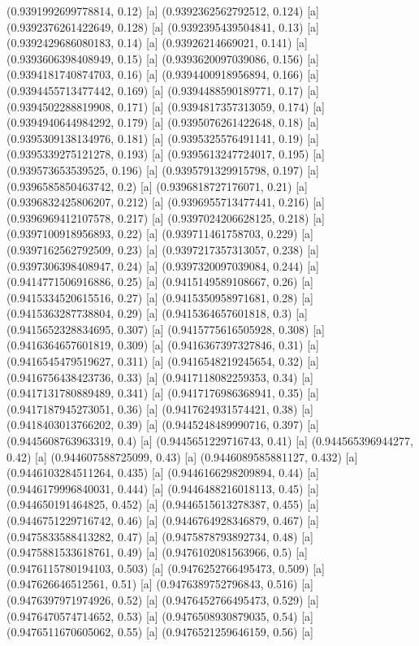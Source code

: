 {{{(0.9391992699778814, 0.12) [a] 
(0.9392362562792512, 0.124) [a] 
(0.9392376261422649, 0.128) [a] 
(0.9392395439504841, 0.13) [a] 
(0.9392429686080183, 0.14) [a] 
(0.93926214669021, 0.141) [a] 
(0.9393606398408949, 0.15) [a] 
(0.9393620097039086, 0.156) [a] 
(0.9394181740874703, 0.16) [a] 
(0.9394400918956894, 0.166) [a] 
(0.9394455713477442, 0.169) [a] 
(0.9394488590189771, 0.17) [a] 
(0.9394502288819908, 0.171) [a] 
(0.9394817357313059, 0.174) [a] 
(0.9394940644984292, 0.179) [a] 
(0.9395076261422648, 0.18) [a] 
(0.9395309138134976, 0.181) [a] 
(0.9395325576491141, 0.19) [a] 
(0.9395339275121278, 0.193) [a] 
(0.9395613247724017, 0.195) [a] 
(0.939573653539525, 0.196) [a] 
(0.9395791329915798, 0.197) [a] 
(0.9396585850463742, 0.2) [a] 
(0.9396818727176071, 0.21) [a] 
(0.9396832425806207, 0.212) [a] 
(0.9396955713477441, 0.216) [a] 
(0.9396969412107578, 0.217) [a] 
(0.9397024206628125, 0.218) [a] 
(0.9397100918956893, 0.22) [a] 
(0.939711461758703, 0.229) [a] 
(0.9397162562792509, 0.23) [a] 
(0.9397217357313057, 0.238) [a] 
(0.9397306398408947, 0.24) [a] 
(0.9397320097039084, 0.244) [a] 
(0.9414771506916886, 0.25) [a] 
(0.9415149589108667, 0.26) [a] 
(0.9415334520615516, 0.27) [a] 
(0.9415350958971681, 0.28) [a] 
(0.9415363287738804, 0.29) [a] 
(0.9415364657601818, 0.3) [a] 
(0.9415652328834695, 0.307) [a] 
(0.9415775616505928, 0.308) [a] 
(0.9416364657601819, 0.309) [a] 
(0.9416367397327846, 0.31) [a] 
(0.9416545479519627, 0.311) [a] 
(0.9416548219245654, 0.32) [a] 
(0.9416756438423736, 0.33) [a] 
(0.9417118082259353, 0.34) [a] 
(0.9417131780889489, 0.341) [a] 
(0.9417176986368941, 0.35) [a] 
(0.9417187945273051, 0.36) [a] 
(0.9417624931574421, 0.38) [a] 
(0.9418403013766202, 0.39) [a] 
(0.9445248489990716, 0.397) [a] 
(0.9445608763963319, 0.4) [a] 
(0.9445651229716743, 0.41) [a] 
(0.944565396944277, 0.42) [a] 
(0.944607588725099, 0.43) [a] 
(0.9446089585881127, 0.432) [a] 
(0.9446103284511264, 0.435) [a] 
(0.9446166298209894, 0.44) [a] 
(0.9446179996840031, 0.444) [a] 
(0.9446488216018113, 0.45) [a] 
(0.944650191464825, 0.452) [a] 
(0.9446515613278387, 0.455) [a] 
(0.9446751229716742, 0.46) [a] 
(0.9446764928346879, 0.467) [a] 
(0.9475833588413282, 0.47) [a] 
(0.9475878793892734, 0.48) [a] 
(0.9475881533618761, 0.49) [a] 
(0.9476102081563966, 0.5) [a] 
(0.9476115780194103, 0.503) [a] 
(0.9476252766495473, 0.509) [a] 
(0.947626646512561, 0.51) [a] 
(0.9476389752796843, 0.516) [a] 
(0.9476397971974926, 0.52) [a] 
(0.9476452766495473, 0.529) [a] 
(0.9476470574714652, 0.53) [a] 
(0.9476508930879035, 0.54) [a] 
(0.9476511670605062, 0.55) [a] 
(0.9476521259646159, 0.56) [a] 
}}}
